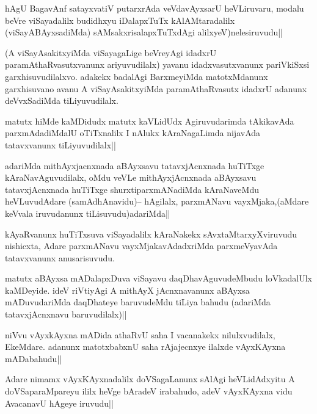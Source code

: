 \begin{artha}
hAgU BagavAnf satayxvatiV putarxrAda veVdavAyxsarU heVLiruvaru, modalu beVre viSayadalilx budidhxyu iDalapxTuTx kAlAMtaradalilx (viSayABAyxsadiMda) sAMsakxrisalapxTuTxdAgi alilxyeV)nelesiruvudu||
\end{artha}

\begin{artha}
(A viSayAsakitxyiMda viSayagaLige beVreyAgi idadxrU paramAthaRvasutxvanunx ariyuvudilalx) yavanu idadxvasutxvanunx pariVkiSxsi garxhisuvudilalxvo. adakekx badalAgi BarxmeyiMda matotxMdanunx garxhisuvano avanu A viSayAsakitxyiMda paramAthaRvasutx idadxrU adanunx deVvxSadiMda tiLiyuvudilalx.
\end{artha}

\begin{artha}
matutx hiMde kaMDidudx matutx kaVLidUdx Agiruvudarimda tAkikavAda parxmAdadiMdalU oTiTxnalilx I nAlukx kAraNagaLimda nijavAda tatavxvanunx tiLiyuvudilalx||
\end{artha}

\begin{artha}
adariMda mithAyxjacnxnada aBAyxsavu tatavxjAcnxnada huTiTxge kAraNavAguvudilalx, oMdu veVLe mithAyxjAcnxnada aBAyxsavu tatavxjAcnxnada huTiTxge shurxtiparxmANadiMda kAraNaveMdu heVLuvudAdare (samAdhAnavidu)-- hAgilalx, parxmANavu vayxMjaka,(aMdare keVvala iruvudanunx tiLisuvudu)adariMda||
\end{artha}

\begin{artha}
kAyaRvanunx huTiTxsuva viSayadalilx kAraNakekx sAvxtaMtarxyXviruvudu nishicxta, Adare parxmANavu vayxMjakavAdadxriMda parxmeVyavAda tatavxvanunx anusarisuvudu.
\end{artha}

\begin{artha}
matutx aBAyxsa mADalapxDuva viSayavu daqDhavAguvudeMbudu loVkadalUlx kaMDeyide. ideV riVtiyAgi A mithAyX jAcnxnavanunx aBAyxsa mADuvudariMda daqDhateye baruvudeMdu tiLiya bahudu (adariMda tatavxjAcnxnavu baruvudilalx)||
\end{artha}

\begin{artha}
niVvu vAyxkAyxna mADida athaRvU saha I vacanakekx nilulxvudilalx, EkeMdare. adanunx matotxbabxnU  saha rAjajecnxye ilalxde vAyxKAyxna mADabahudu||
\end{artha}

\begin{artha}
Adare nimamx vAyxKAyxnadalilx doVSagaLanunx sAlAgi heVLidAdxyitu A doVSaparaMpareyu ililx heVge bAradeV irabahudo, adeV vAyxKAyxna vidu  AvacanavU hAgeye iruvudu||
\end{artha}


